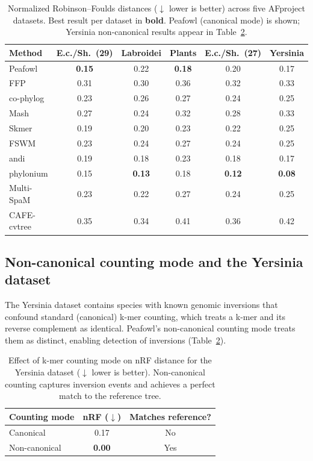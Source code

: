 \documentclass[11pt]{article}
\begin{document}
\begin{table}[H]
\centering
\caption{Normalized Robinson--Foulds distances ($\downarrow$ lower is better) across five AFproject datasets. Best result per dataset in \textbf{bold}. Peafowl (canonical mode) is shown; Yersinia non-canonical results appear in Table~\ref{tab:yersinia}.}
\label{tab:afproject}
\begin{tabular}{lccccc}
\toprule
\textbf{Method} & \textbf{E.c./Sh.~(29)} & \textbf{Labroidei} & \textbf{Plants} & \textbf{E.c./Sh.~(27)} & \textbf{Yersinia} \\
\midrule
Peafowl & \textbf{0.15} & 0.22 & \textbf{0.18} & 0.20 & 0.17 \\
FFP & 0.31 & 0.30 & 0.36 & 0.32 & 0.33 \\
co-phylog & 0.23 & 0.26 & 0.27 & 0.24 & 0.25 \\
Mash & 0.27 & 0.24 & 0.32 & 0.28 & 0.33 \\
Skmer & 0.19 & 0.20 & 0.23 & 0.22 & 0.25 \\
FSWM & 0.23 & 0.24 & 0.27 & 0.24 & 0.25 \\
andi & 0.19 & 0.18 & 0.23 & 0.18 & 0.17 \\
phylonium & 0.15 & \textbf{0.13} & 0.18 & \textbf{0.12} & \textbf{0.08} \\
Multi-SpaM & 0.23 & 0.22 & 0.27 & 0.24 & 0.25 \\
CAFE-cvtree & 0.35 & 0.34 & 0.41 & 0.36 & 0.42 \\
\bottomrule
\end{tabular}
\end{table}

\subsection{Non-canonical counting mode and the Yersinia dataset}

The Yersinia dataset contains species with known genomic inversions that confound standard (canonical) k-mer counting, which treats a k-mer and its reverse complement as identical. Peafowl's non-canonical counting mode treats them as distinct, enabling detection of inversions (Table~\ref{tab:yersinia}).

\begin{table}[H]
\centering
\caption{Effect of k-mer counting mode on nRF distance for the Yersinia dataset ($\downarrow$ lower is better). Non-canonical counting captures inversion events and achieves a perfect match to the reference tree.}
\label{tab:yersinia}
\begin{tabular}{lcc}
\toprule
\textbf{Counting mode} & \textbf{nRF ($\downarrow$)} & \textbf{Matches reference?} \\
\midrule
Canonical & 0.17 & No \\
Non-canonical & \textbf{0.00} & Yes \\
\bottomrule
\end{tabular}
\end{table}
\end{document}
